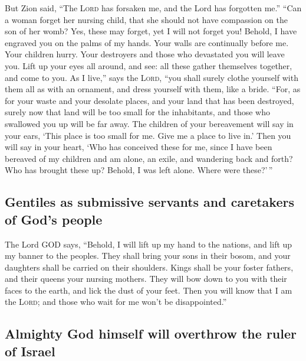  But Zion said, ``The \textsc{Lord} has forsaken me, and
the Lord has forgotten me.''  ``Can a woman forget her
nursing child, that she should not have compassion on the son of her
womb? Yes, these may forget, yet I will not forget you! 
Behold, I have engraved you on the palms of my hands. Your walls are
continually before me.  Your children hurry. Your
destroyers and those who devastated you will leave you. 
Lift up your eyes all around, and see: all these gather themselves
together, and come to you. As I live,'' says the \textsc{Lord}, ``you
shall surely clothe yourself with them all as with an ornament, and
dress yourself with them, like a bride.  ``For, as for
your waste and your desolate places, and your land that has been
destroyed, surely now that land will be too small for the inhabitants,
and those who swallowed you up will be far away.  The
children of your bereavement will say in your ears, `This place is too
small for me. Give me a place to live in.'  Then you will
say in your heart, `Who has conceived these for me, since I have been
bereaved of my children and am alone, an exile, and wandering back and
forth? Who has brought these up? Behold, I was left alone. Where were
these?'\,''

\hypertarget{gentiles-as-submissive-servants-and-caretakers-of-gods-people}{%
\subsection{Gentiles as submissive servants and caretakers of God's
people}\label{gentiles-as-submissive-servants-and-caretakers-of-gods-people}}

 The Lord GOD says, ``Behold, I will lift up my hand to
the nations, and lift up my banner to the peoples. They shall bring your
sons in their bosom, and your daughters shall be carried on their
shoulders.  Kings shall be your foster fathers, and their
queens your nursing mothers. They will bow down to you with their faces
to the earth, and lick the dust of your feet. Then you will know that I
am the \textsc{Lord}; and those who wait for me won't be disappointed.''

\hypertarget{almighty-god-himself-will-overthrow-the-ruler-of-israel}{%
\subsection{Almighty God himself will overthrow the ruler of
Israel}\label{almighty-god-himself-will-overthrow-the-ruler-of-israel}}

